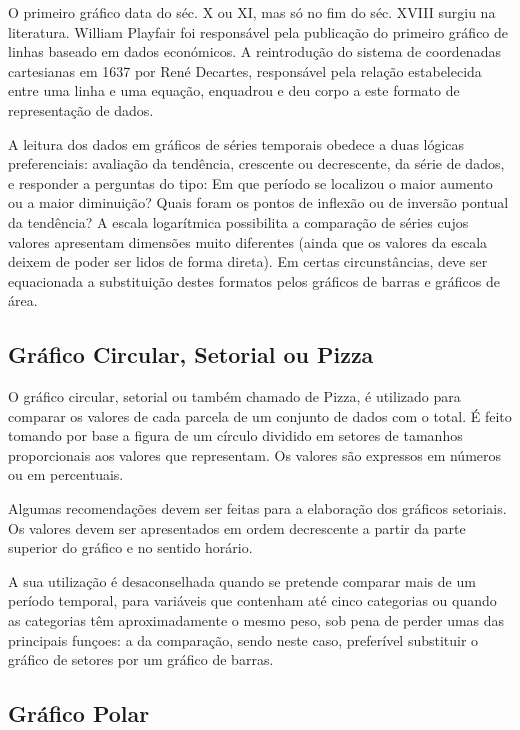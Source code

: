 O primeiro gráfico data do séc. X ou XI, mas só no fim do séc. XVIII surgiu na literatura. William Playfair foi responsável pela publicação do primeiro gráfico de linhas baseado em dados económicos. A reintrodução do sistema de coordenadas cartesianas em 1637 por René Decartes, responsável pela relação estabelecida entre uma linha e uma equação, enquadrou e deu corpo a este formato de representação de dados.\vskip0.3cm

A leitura dos dados em gráficos de séries temporais obedece a duas lógicas preferenciais: avaliação da tendência, crescente ou decrescente, da série de dados, e responder a perguntas do tipo: Em que período se localizou o maior aumento ou a maior diminuição? Quais foram os pontos de inflexão ou de inversão pontual da tendência? A escala logarítmica possibilita a comparação de séries cujos valores apresentam dimensões muito diferentes (ainda que os valores da escala deixem de poder ser lidos de forma direta). Em certas circunstâncias, deve ser equacionada a substituição destes formatos pelos gráficos de barras e gráficos de área.

\newpage
\subsection{Gráfico Circular, Setorial ou Pizza}

O gráfico circular, setorial ou também chamado de Pizza, é
utilizado para comparar os valores de cada parcela de um conjunto
de dados com o total. É feito tomando por base a figura de um
círculo dividido em setores de tamanhos proporcionais aos valores
que representam. Os valores são expressos em números ou em percentuais. \vskip0.3cm

Algumas recomendações devem ser feitas para a elaboração dos
gráficos setoriais. Os valores devem ser apresentados em ordem
decrescente a partir da parte superior do gráfico e no sentido
horário.\vskip0.3cm

A sua utilização é desaconselhada quando se pretende comparar mais
de um período temporal, para variáveis que contenham até cinco
categorias ou quando as categorias têm aproximadamente o mesmo
peso, sob pena de perder umas das principais funçoes: a da
comparação, sendo neste caso, preferível substituir o gráfico de
setores por um gráfico de barras.


\newpage
\subsection{Gráfico Polar}

